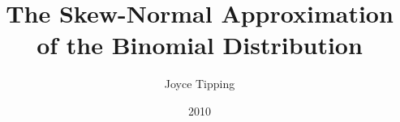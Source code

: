 \documentclass{article}
\theoremstyle{plain}
\begin{document}
\title{The Skew-Normal Approximation of the Binomial Distribution}
\author{Joyce Tipping}
\date{2010}
\maketitle
\end{document}

